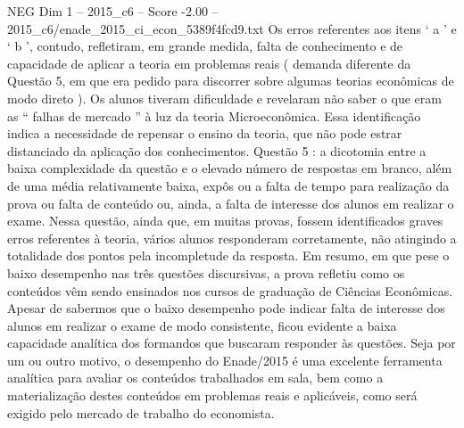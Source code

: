 \begin{textsample}{NEG Dim 1 – 2015\_c6 – Score -2.00 – 2015\_c6/enade\_2015\_ci\_econ\_5389f4fcd9.txt}
Os erros referentes aos itens ‘ a ’ e ‘ b ’, contudo, refletiram, em grande medida, falta de conhecimento e de capacidade de aplicar a teoria em problemas reais ( demanda diferente da Questão 5, em que era pedido para discorrer sobre algumas teorias econômicas de modo direto ).
Os alunos tiveram dificuldade e revelaram não saber o que eram as “ falhas de mercado ” à luz da teoria Microeconômica.
Essa identificação indica a necessidade de repensar o ensino da teoria, que não pode estrar distanciado da aplicação dos conhecimentos.
Questão 5 : a dicotomia entre a baixa complexidade da questão e o elevado número de respostas em branco, além de uma média relativamente baixa, expôs ou a falta de tempo para realização da prova ou falta de conteúdo ou, ainda, a falta de interesse dos alunos em realizar o exame.
Nessa questão, ainda que, em muitas provas, fossem identificados graves erros referentes à teoria, vários alunos responderam corretamente, não atingindo a totalidade dos pontos pela incompletude da resposta.
Em resumo, em que pese o baixo desempenho nas três questões discursivas, a prova refletiu como os conteúdos vêm sendo ensinados nos cursos de graduação de Ciências Econômicas.
Apesar de sabermos que o baixo desempenho pode indicar falta de interesse dos alunos em realizar o exame de modo consistente, ficou evidente a baixa capacidade analítica dos formandos que buscaram responder às questões.
Seja por um ou outro motivo, o desempenho do Enade/2015 é uma excelente ferramenta analítica para avaliar os conteúdos trabalhados em sala, bem como a materialização destes conteúdos em problemas reais e aplicáveis, como será exigido pelo mercado de trabalho do economista.

\end{textsample}
